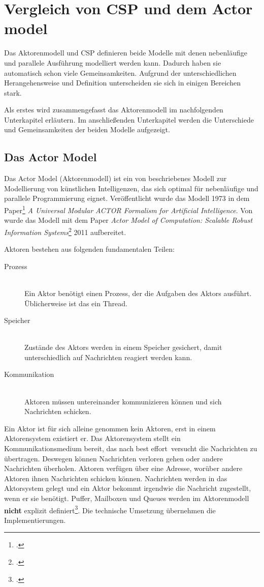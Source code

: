 \section{Vergleich von \acs{CSP} und dem Actor model}
Das Aktorenmodell und \ac{CSP} definieren beide Modelle mit denen nebenläufige und parallele Ausführung modelliert werden kann. Dadurch haben sie automatisch schon viele Gemeinsamkeiten. Aufgrund der unterschiedlichen Herangehensweise und Definition unterscheiden sie sich in einigen Bereichen stark. 

Als erstes wird zusammengefasst das Aktorenmodell im nachfolgenden Unterkapitel erläutern. Im anschließenden Unterkapitel werden die Unterschiede und Gemeinsamkeiten der beiden Modelle aufgezeigt.

\subsection{Das Actor Model}
Das Actor Model (Aktorenmodell) ist ein von \citeauthor{ACTORS} beschriebenes Modell zur Modellierung von künstlichen Intelligenzen, das sich optimal für nebenläufige und parallele Programmierung eignet. Veröffentlicht wurde das Modell 1973 in dem Paper\footcite{ACTORS} \textit{A Universal Modular ACTOR Formalism for Artificial Intelligence}. Von \citeauthor{ACTORSNEW} wurde das Modell mit dem Paper \textit{Actor Model of Computation: Scalable Robust Information Systems}\footcite{ACTORSNEW} 2011 aufbereitet. 

Aktoren bestehen aus folgenden fundamentalen Teilen:

\begin{description}
\item[Prozess]\hfill \\
Ein Aktor benötigt einen Prozess, der die Aufgaben des Aktors ausführt. Üblicherweise ist das ein Thread.
\item[Speicher]\hfill \\
Zustände des Aktors werden in einem Speicher gesichert, damit unterschiedlich auf Nachrichten reagiert werden kann.
\item[Kommunikation] \hfill \\
Aktoren müssen untereinander kommunizieren können und sich Nachrichten schicken.
\end{description}

Ein Aktor ist für sich alleine genommen kein Aktoren, erst in einem Aktorensystem existiert er. Das Aktorensystem stellt ein Kommunikationsmedium bereit, das nach \glqq best effort\grqq\ versucht die Nachrichten zu übertragen. Deswegen können Nachrichten verloren gehen oder andere Nachrichten überholen. Aktoren verfügen über eine Adresse, worüber andere Aktoren ihnen Nachrichten schicken können. Nachrichten werden in das Aktorsystem gelegt und ein Aktor bekommt irgendwie die Nachricht zugestellt, wenn er sie benötigt. Puffer, Mailboxen und Queues werden im Aktorenmodell \textbf{nicht} explizit definiert\footcite[Seite 3, Rechte Spalte]{ACTORSNEW}. Die technische Umsetzung übernehmen die Implementierungen.

